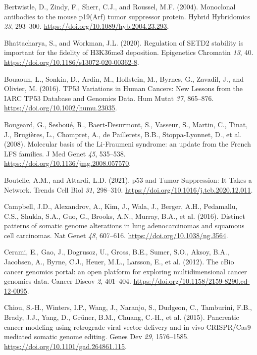 \begin{CSLReferences}{0}{0}
\leavevmode{}%
Bertwistle, D., Zindy, F., Sherr, C.J., and Roussel, M.F. (2004). Monoclonal antibodies to the mouse p19(Arf) tumor suppressor protein. Hybrid Hybridomics \emph{23}, 293--300. \url{https://doi.org/10.1089/hyb.2004.23.293}.

\leavevmode{}%
Bhattacharya, S., and Workman, J.L. (2020). Regulation of SETD2 stability is important for the fidelity of H3K36me3 deposition. Epigenetics Chromatin \emph{13}, 40. \url{https://doi.org/10.1186/s13072-020-00362-8}.

\leavevmode{}%
Bouaoun, L., Sonkin, D., Ardin, M., Hollstein, M., Byrnes, G., Zavadil, J., and Olivier, M. (2016). TP53 Variations in Human Cancers: New Lessons from the IARC TP53 Database and Genomics Data. Hum Mutat \emph{37}, 865--876. \url{https://doi.org/10.1002/humu.23035}.

\leavevmode{}%
Bougeard, G., Sesboüé, R., Baert-Desurmont, S., Vasseur, S., Martin, C., Tinat, J., Brugières, L., Chompret, A., de Paillerets, B.B., Stoppa-Lyonnet, D., et al. (2008). Molecular basis of the Li-Fraumeni syndrome: an update from the French LFS families. J Med Genet \emph{45}, 535--538. \url{https://doi.org/10.1136/jmg.2008.057570}.

\leavevmode{}%
Boutelle, A.M., and Attardi, L.D. (2021). p53 and Tumor Suppression: It Takes a Network. Trends Cell Biol \emph{31}, 298--310. \url{https://doi.org/10.1016/j.tcb.2020.12.011}.

\leavevmode{}%
Campbell, J.D., Alexandrov, A., Kim, J., Wala, J., Berger, A.H., Pedamallu, C.S., Shukla, S.A., Guo, G., Brooks, A.N., Murray, B.A., et al. (2016). Distinct patterns of somatic genome alterations in lung adenocarcinomas and squamous cell carcinomas. Nat Genet \emph{48}, 607--616. \url{https://doi.org/10.1038/ng.3564}.

\leavevmode{}%
Cerami, E., Gao, J., Dogrusoz, U., Gross, B.E., Sumer, S.O., Aksoy, B.A., Jacobsen, A., Byrne, C.J., Heuer, M.L., Larsson, E., et al. (2012). The cBio cancer genomics portal: an open platform for exploring multidimensional cancer genomics data. Cancer Discov \emph{2}, 401--404. \url{https://doi.org/10.1158/2159-8290.cd-12-0095}.

\leavevmode{}%
Chiou, S.-H., Winters, I.P., Wang, J., Naranjo, S., Dudgeon, C., Tamburini, F.B., Brady, J.J., Yang, D., Grüner, B.M., Chuang, C.-H., et al. (2015). Pancreatic cancer modeling using retrograde viral vector delivery and in vivo CRISPR/Cas9-mediated somatic genome editing. Genes Dev \emph{29}, 1576--1585. \url{https://doi.org/10.1101/gad.264861.115}.


\end{CSLReferences}
